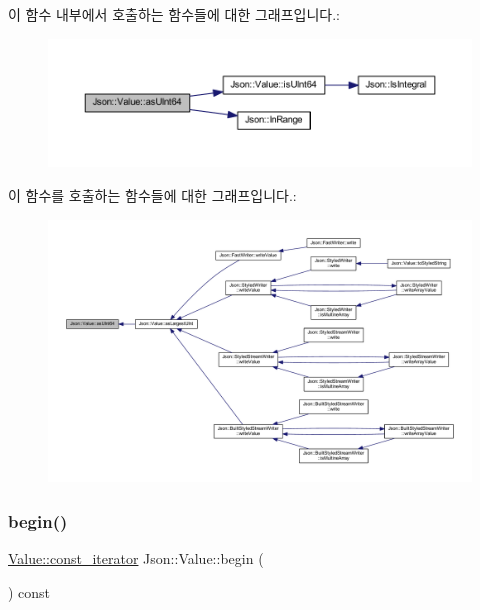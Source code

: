 이 함수 내부에서 호출하는 함수들에 대한 그래프입니다.\+:\nopagebreak
\begin{figure}[H]
\begin{center}
\leavevmode
\includegraphics[width=350pt]{class_json_1_1_value_a0e44a5a4cd0c099f9570dfa25813eb60_cgraph}
\end{center}
\end{figure}
이 함수를 호출하는 함수들에 대한 그래프입니다.\+:\nopagebreak
\begin{figure}[H]
\begin{center}
\leavevmode
\includegraphics[width=350pt]{class_json_1_1_value_a0e44a5a4cd0c099f9570dfa25813eb60_icgraph}
\end{center}
\end{figure}
\mbox{\label{class_json_1_1_value_a015459a3950c198d63a2d3be8f5ae296}} 
\subsubsection{\texorpdfstring{begin()}{begin()}\hspace{0.1cm}{\footnotesize\ttfamily [1/2]}}
{\footnotesize\ttfamily \hyperlink{class_json_1_1_value_af92282ca92b58b320debd486afb7696a}{Value\+::const\+\_\+iterator} Json\+::\+Value\+::begin (\begin{DoxyParamCaption}{ }\end{DoxyParamCaption}) const}



